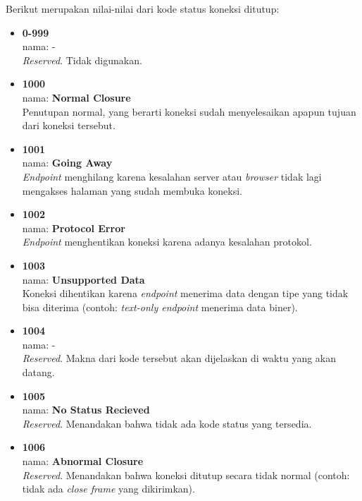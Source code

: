 \documentclass[a4paper,twoside]{article}
\begin{document}
\begin{enumerate}
\begin{enumerate}
			Berikut merupakan nilai-nilai dari kode status koneksi ditutup:
			
			\begin{itemize}
				\item \textbf{0-999} \\ nama: - \\ \textit{Reserved}. Tidak digunakan.
				
				\item \textbf{1000} \\ nama: \textbf{Normal Closure} \\ Penutupan normal, yang berarti koneksi sudah menyelesaikan apapun tujuan dari koneksi tersebut.
				
				\item \textbf{1001} \\ nama: \textbf{Going Away} \\ \textit{Endpoint} menghilang karena kesalahan server atau \textit{browser} tidak lagi mengakses halaman yang sudah membuka koneksi.
				
				\item \textbf{1002} \\ nama: \textbf{Protocol Error} \\ \textit{Endpoint} menghentikan koneksi karena adanya kesalahan protokol.
				
				\item \textbf{1003} \\ nama: \textbf{Unsupported Data} \\ Koneksi dihentikan karena \textit{endpoint} menerima data dengan tipe yang tidak bisa diterima (contoh: \textit{text-only endpoint} menerima data biner).
				
				\item \textbf{1004} \\ nama: - \\ \textit{Reserved}. Makna dari kode tersebut akan dijelaskan di waktu yang akan datang.
				
				\item \textbf{1005} \\ nama: \textbf{No Status Recieved} \\ \textit{Reserved}. Menandakan bahwa tidak ada kode status yang tersedia.
				
				\item \textbf{1006} \\ nama: \textbf{Abnormal Closure} \\ \textit{Reserved}. Menandakan bahwa koneksi ditutup secara tidak normal (contoh: tidak ada \textit{close frame} yang dikirimkan).
				

\end{itemize}
\end{enumerate}
\end{enumerate}
\end{document}
